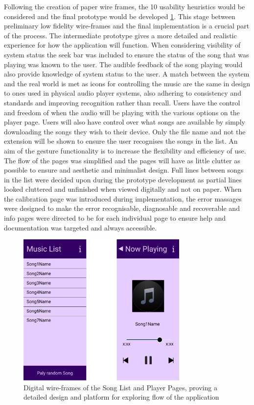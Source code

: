 \documentclass{l4proj}
\begin{document}
Following the creation of paper wire frames, the 10 usability heuristics would be considered and the final prototype would be developed \ref{fig:digitalWF}. This stage between preliminary low fidelity wire-frames and the final implementation is a crucial part of the process. The intermediate prototype gives a more detailed and realistic experience for how the application will function. When considering visibility of system status the seek bar was included to ensure the status of the song that was playing was known to the user. The audible feedback of the song playing would also provide knowledge of system status to the user. A match between the system and the real world is met as icons for controlling the music are the same in design to ones used in physical audio player systems, also adhering to consistency and standards and improving recognition rather than recall. Users have the control and freedom of when the audio will be playing with the various options on the player page. Users will also have control over what songs are available by simply downloading the songs they wish to their device. Only the file name and not the extension will be shown to ensure the user recognises the songs in the list. An aim of the gesture functionality is to increase the flexibility and efficiency of use. The flow of the pages was simplified and the pages will have as little clutter as possible to ensure and aesthetic and minimalist design. Full lines between songs in the list were decided upon during the prototype development as partial lines looked cluttered and unfinished when viewed digitally and not on paper. When the calibration page was introduced during implementation, the error massages were designed to make the error recognisable, diagnosable and recoverable and info pages were directed to be for each individual page to ensure help and documentation was targeted and always accessible. 

\begin{figure}[!htb]
    \centering
    \includegraphics[width=0.75\textwidth]{images/DigWireframes.PNG}
        \caption{Digital wire-frames of the Song List and Player Pages, proving a detailed design and platform for exploring flow of the application}
        \label{fig:digitalWF}
\end{figure}
\end{document}
